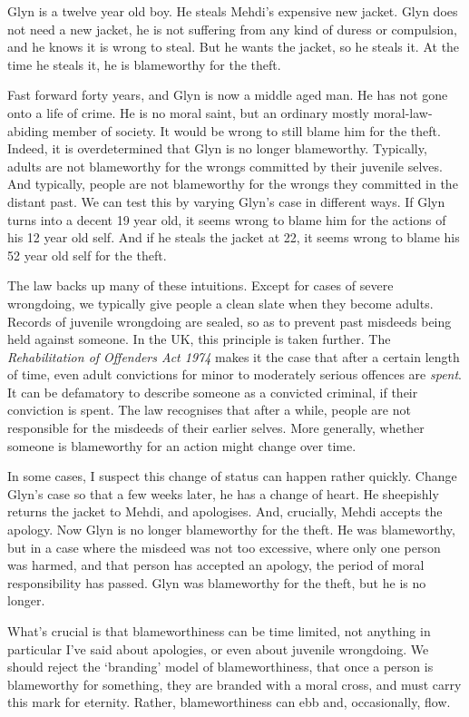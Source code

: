 \gls{Glyn} is a twelve year old boy. He steals \gls{Mehdi}'s expensive new jacket. \gls{Glyn} does not need a new jacket, he is not suffering from any kind of duress or compulsion, and he knows it is wrong to steal. But he wants the jacket, so he steals it. At the time he steals it, he is blameworthy for the theft.

Fast forward forty years, and \gls{Glyn} is now a middle aged man. He has not gone onto a life of crime. He is no moral saint, but an ordinary mostly moral-law-abiding member of society. It would be wrong to still blame him for the theft. Indeed, it is overdetermined that \gls{Glyn} is no longer blameworthy. Typically, adults are not blameworthy for the wrongs committed by their juvenile selves. And typically, people are not blameworthy for the wrongs they committed in the distant past. We can test this by varying \gls{Glyn}'s case in different ways. If \gls{Glyn} turns into a decent 19 year old, it seems wrong to blame him for the actions of his 12 year old self. And if he steals the jacket at 22, it seems wrong to blame his 52 year old self for the theft.

The law backs up many of these intuitions. Except for cases of severe wrongdoing, we typically give people a clean slate when they become adults. Records of juvenile wrongdoing are sealed, so as to prevent past misdeeds being held against someone. In the UK, this principle is taken further. The \emph{Rehabilitation of Offenders Act 1974} makes it the case that after a certain length of time, even adult convictions for minor to moderately serious offences are \emph{spent}. It can be defamatory to describe someone as a convicted criminal, if their conviction is spent. The law recognises that after a while, people are not responsible for the misdeeds of their earlier selves. More generally, whether someone is blameworthy for an action might change over time.

In some cases, I suspect this change of status can happen rather quickly. Change \gls{Glyn}'s case so that a few weeks later, he has a change of heart. He sheepishly returns the jacket to \gls{Mehdi}, and apologises. And, crucially, \gls{Mehdi} accepts the apology. Now \gls{Glyn} is no longer blameworthy for the theft. He was blameworthy, but in a case where the misdeed was not too excessive, where only one person was harmed, and that person has accepted an apology, the period of moral responsibility has passed. \gls{Glyn} was blameworthy for the theft, but he is no longer.

What's crucial is that blameworthiness can be time limited, not anything in particular I've said about apologies, or even about juvenile wrongdoing. We should reject the `branding' model of blameworthiness, that once a person is blameworthy for something, they are branded with a moral cross, and must carry this mark for eternity. Rather, blameworthiness can ebb and, occasionally, flow.

